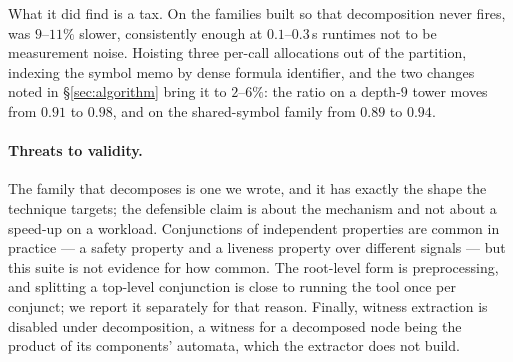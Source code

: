 What it did find is a tax. On the families built so that decomposition never
fires,  was $9$--$11\%$ slower, consistently enough at $0.1$--$0.3$\,s
runtimes not to be measurement noise. Hoisting three per-call allocations out of
the partition, indexing the symbol memo by dense formula identifier, and the two
changes noted in \S\ref{sec:algorithm} bring it to $2$--$6\%$: the ratio on a
depth-$9$ tower moves from $0.91$ to $0.98$, and on the shared-symbol family from
$0.89$ to $0.94$.

\paragraph{Threats to validity.} The family that decomposes is one we wrote, and
it has exactly the shape the technique targets; the defensible claim is about
the mechanism and not about a speed-up on a workload. Conjunctions of
independent properties are common in practice --- a safety property and a
liveness property over different signals --- but this suite is not evidence for
how common. The root-level form is preprocessing, and splitting a top-level
conjunction is close to running the tool once per conjunct; we report it
separately for that reason. Finally, witness extraction is disabled under
decomposition, a witness for a decomposed node being the product of its
components' automata, which the extractor does not build.
